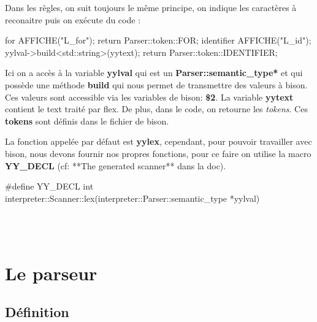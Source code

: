 \documentclass[a4paper]{article}
\begin{document}
\noindent
Dans les règles, on suit toujours le même principe, on indique les caractères à reconaitre puis on exécute du code :\\

\begin{code}
for          { AFFICHE("L_for"); return Parser::token::FOR; }
{identifier} {
  AFFICHE("L_id");
  yylval->build<std::string>(yytext);
  return Parser::token::IDENTIFIER;
}
\end{code}\leavevmode\newline

\noindent
Ici on a accès à la variable \textbf{yylval} qui est un \textbf{Parser::semantic\_type*} et qui possède une méthode \textbf{build} qui nous permet de transmettre des valeurs à bison.\\
Ces valeurs sont accessible via les variables de bison: \textbf{\$2}. La variable
\textbf{yytext} contient le text traité par flex. De plus, dans le code, on retourne
les \textit{tokens}. Ces \textbf{tokens} sont définis dans le fichier de bison.
\newline

La fonction appelée par défaut est \textbf{yylex}, cependant, pour pouvoir travailler avec bison, nous devons fournir nos propres fonctions, pour ce faire on utilise la macro \textbf{YY\_DECL} (cf: **The generated scanner** dans la doc).

\begin{code}
#define YY_DECL int interpreter::Scanner::lex(interpreter::Parser::semantic_type *yylval)
\end{code}\leavevmode\\~\\

\clearpage{}





\section{Le parseur}

\subsection{Définition}
\end{document}
